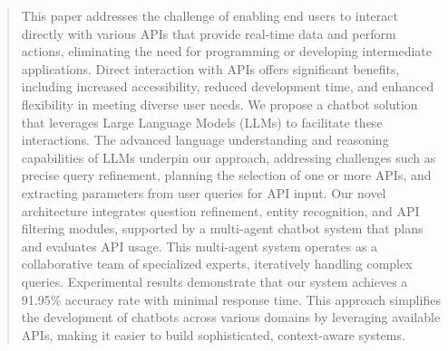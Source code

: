 \documentclass[runningheads]{llncs}
\begin{document}
%
%
%
\maketitle              %
%
\begin{abstract}
This paper addresses the challenge of enabling end users to interact directly with various APIs that provide real-time data and perform actions, eliminating the need for programming or developing intermediate applications. Direct interaction with APIs offers significant benefits, including increased accessibility, reduced development time, and enhanced flexibility in meeting diverse user needs. 
We propose a chatbot solution that leverages Large Language Models (LLMs) to facilitate these interactions. The advanced language understanding and reasoning capabilities of LLMs underpin our approach, addressing challenges such as precise query refinement, planning the selection of one or more APIs, and extracting parameters from user queries for API input. Our novel architecture integrates question refinement, entity recognition, and API filtering modules, supported by a multi-agent chatbot system that plans and evaluates API usage. This multi-agent system operates as a collaborative team of specialized experts, iteratively handling complex queries. Experimental results demonstrate that our system achieves a 91.95\% accuracy rate with minimal response time. This approach simplifies the development of chatbots across various domains by leveraging available APIs, making it easier to build sophisticated, context-aware systems.



\end{abstract}
%
%
%
\end{document}
